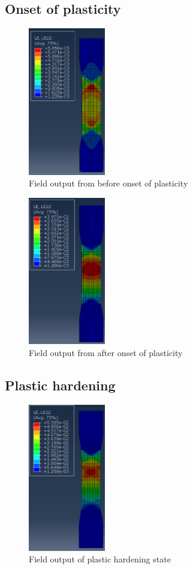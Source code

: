 \documentclass[11pt]{article}
\numberwithin{equation}{section}
\begin{document}
\subsection{Onset of plasticity}
\begin{figure}[H]
    \centering
    \includegraphics[width = 0.3\textwidth]{./img/onset1.png}
    \caption{Field output from before onset of plasticity}
\end{figure}
\begin{figure}[H]
    \centering
    \includegraphics[width = 0.3\textwidth]{./img/onset2.png}
    \caption{Field output from after onset of plasticity}
\end{figure}
\subsection{Plastic hardening}
\begin{figure}[H]
    \centering
    \includegraphics[width = 0.3\textwidth]{./img/plasticHardening.png}
    \caption{Field output of plastic hardening state}
\end{figure}
\end{document}
